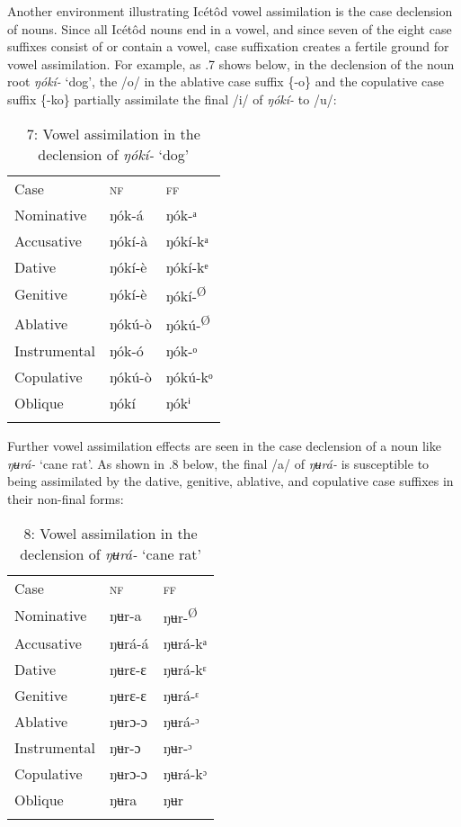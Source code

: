 Another environment illustrating Icétôd vowel assimilation is the case declension of nouns. Since all Icétôd nouns end in a vowel, and since seven of the eight case suffixes consist of or contain a vowel, case suffixation creates a fertile ground for vowel assimilation. For example, as .7 shows below, in the declension of the noun root \textit{ŋókí- }‘dog’, the /o/ in the ablative case suffix \{-o\} and the copulative case suffix \{-ko\} partially assimilate the final /i/ of \textit{ŋókí- }to /u/:


\begin{table}
\caption{7: Vowel assimilation in the declension of \textit{ŋókí- }‘dog’}
\label{tab:2}


\begin{tabularx}{\textwidth}{XXX}
\lsptoprule

Case & \textsc{nf} & \textsc{ff}\\
Nominative & ŋók-á & ŋók-ᵃ\\
Accusative & ŋókí-à & ŋókí-kᵃ\\
Dative & ŋókí-è & ŋókí-kᵉ\\
Genitive & ŋókí-è & ŋókí-\textsuperscript{Ø}\\
Ablative & ŋókú-ò & ŋókú-\textsuperscript{Ø}\\
Instrumental & ŋók-ó & ŋók-ᵒ\\
Copulative & ŋókú-ò & ŋókú-kᵒ\\
Oblique & ŋókí & ŋókⁱ\\
\lspbottomrule
\end{tabularx}
\end{table}

Further vowel assimilation effects are seen in the case declension of a noun like \textit{ŋʉrá- }‘cane rat’. As shown in .8 below, the final /a/ of \textit{ŋʉrá- }is susceptible to being assimilated by the dative, genitive, ablative, and copulative case suffixes in their non-final forms:


\begin{table}
\caption{8: Vowel assimilation in the declension of \textit{ŋʉrá- }‘cane rat’}
\label{tab:2}


\begin{tabularx}{\textwidth}{XXX}
\lsptoprule

Case & \textsc{nf} & \textsc{ff}\\
Nominative & ŋʉr-a & ŋʉr-\textsuperscript{Ø}\\
Accusative & ŋʉrá-á & ŋʉrá-kᵃ\\
Dative & ŋʉrɛ-ɛ & ŋʉrá-kᵋ\\
Genitive & ŋʉrɛ-ɛ & ŋʉrá-ᵋ\\
Ablative & ŋʉrɔ-ɔ & ŋʉrá-ᵓ\\
Instrumental & ŋʉr-ɔ & ŋʉr-ᵓ\\
Copulative & ŋʉrɔ-ɔ & ŋʉrá-kᵓ\\
Oblique & ŋʉra & ŋʉr\\
\lspbottomrule
\end{tabularx}
\end{table}

